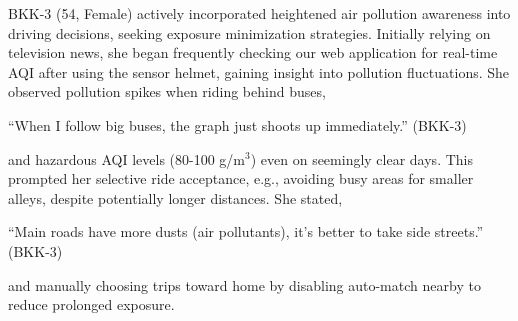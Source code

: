 
BKK-3 (54, Female) actively incorporated heightened air pollution awareness into driving decisions, seeking exposure minimization strategies.
Initially relying on television news, she began frequently checking our web application for real-time AQI after using the sensor helmet, gaining insight into pollution fluctuations.
She observed pollution spikes when riding behind buses,

\begin{quoteb}
    ``When I follow big buses, the graph just shoots up immediately.'' (BKK-3)
\end{quoteb}  


and hazardous AQI levels (80-100 \textmu{}g/m$^3$) even on seemingly clear days.
This prompted her selective ride acceptance, e.g., avoiding busy areas for smaller alleys, despite potentially longer distances.
She stated,

\begin{quoteb}
    ``Main roads have more dusts (air pollutants), it’s better to take side streets.'' (BKK-3)
\end{quoteb}  


and manually choosing trips toward home by disabling auto-match nearby to reduce prolonged exposure.

